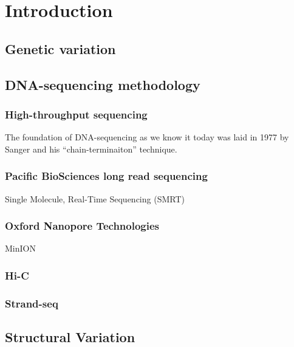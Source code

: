 \chapter{Introduction}

\section{Genetic variation}
\label{sec:variation}

\section{DNA-sequencing methodology}

\subsection{High-throughput sequencing}
\label{sec:hts}

The foundation of DNA-sequencing as we know it today was laid in 1977 by
Sanger and his ``chain-terminaiton'' technique.


\subsection{Pacific BioSciences\textsuperscript{\textregistered} long read sequencing}
\label{sec:pacbio}
Single Molecule, Real-Time Sequencing (SMRT\textsuperscript{\textregistered})

\subsection{Oxford Nanopore Technologies\textsuperscript{\textregistered}}
\label{sec:ont}
MinION\textregistered

\subsection{Hi-C}
\label{sec:hic}

\subsection{Strand-seq}
\label{sec:strandseq}

\section{Structural Variation}
\label{sec:sv}
